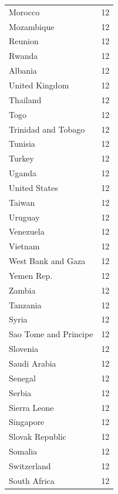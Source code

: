 \documentclass[
  letterpaper,
  DIV=11,
  numbers=noendperiod]{scrreprt}
\begin{document}
\begin{tabular}{lr}
Morocco                  &       12 \\
Mozambique               &       12 \\
Reunion                  &       12 \\
Rwanda                   &       12 \\
Albania                  &       12 \\
United Kingdom           &       12 \\
Thailand                 &       12 \\
Togo                     &       12 \\
Trinidad and Tobago      &       12 \\
Tunisia                  &       12 \\
Turkey                   &       12 \\
Uganda                   &       12 \\
United States            &       12 \\
Taiwan                   &       12 \\
Uruguay                  &       12 \\
Venezuela                &       12 \\
Vietnam                  &       12 \\
West Bank and Gaza       &       12 \\
Yemen Rep.               &       12 \\
Zambia                   &       12 \\
Tanzania                 &       12 \\
Syria                    &       12 \\
Sao Tome and Principe    &       12 \\
Slovenia                 &       12 \\
Saudi Arabia             &       12 \\
Senegal                  &       12 \\
Serbia                   &       12 \\
Sierra Leone             &       12 \\
Singapore                &       12 \\
Slovak Republic          &       12 \\
Somalia                  &       12 \\
Switzerland              &       12 \\
South Africa             &       12 \\

\end{tabular}
\end{document}
